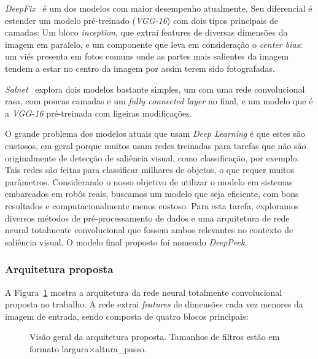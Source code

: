 \documentclass[11pt]{article}
\newcommand{\tit}[1]{\textit{#1}}
\begin{document}
\emph{DeepFix}~\cite{kruthiventi_2015} é um dos modelos com maior desempenho
atualmente. Seu diferencial é estender um modelo pré-treinado (\emph{VGG-16})
com dois tipos principais de camadas: Um bloco \tit{inception}, que extrai
features de diversas dimensões da imagem em paralelo, e um componente que
leva em consideração o \tit{center bias}: um viés presenta em fotos comuns
onde as partes mais salientes da imagem tendem a estar no centro da imagem
por assim terem sido fotografadas.

\emph{Salnet}~\cite{pan_2016} explora dois modelos bastante simples, um
com uma rede convolucional rasa, com poucas camadas e um
\tit{fully connected layer} no final, e um modelo que é a \emph{VGG-16}
pré-treinada com ligeiras modificações.

O grande problema dos modelos atuais que usam \tit{Deep Learning} é que estes
são custosos, em geral porque muitos usam redes treinadas para tarefas que não
são originalmente de detecção de saliência visual, como classificação, por exemplo.
Tais redes são feitas para classificar milhares de objetos, o que requer
muitos parâmetros. Considerando o nosso objetivo de utilizar o modelo em sistemas embarcados em robôs reais, buscamos um modelo que seja eficiente, com bons resultados e computacionalmente menos custoso.
Para esta tarefa, exploramos diversos métodos de pré-processamento de dados
e uma arquitetura de rede neural totalmente convolucional que fossem ambos relevantes
no contexto de saliência visual. O modelo final proposto foi nomeado \tit{DeepPeek}.

\subsubsection{Arquitetura proposta}
A Figura~\ref{fig:model} mostra a arquitetura da rede neural totalmente
convolucional proposta no trabalho.
A rede extrai \tit{features} de dimensões cada vez menores da imagem de
entrada, sendo composta de quatro blocos principais:

\begin{figure}[H]
    \centering
    \def\svgwidth{0.9\columnwidth}
    
    \label{fig:model}
    \caption{Visão geral da arquitetura proposta.
        Tamanhos de filtros estão em formato
        largura$\times$altura\_passo.}
\end{figure}
\end{document}
